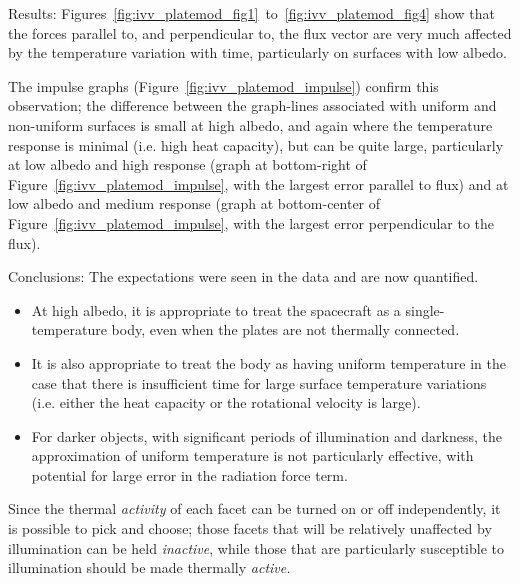 \begin{description}
   \item{Results:}\newline
     Figures~\ref{fig:ivv_platemod_fig1}~to~\ref{fig:ivv_platemod_fig4}
     show that the forces parallel to, and perpendicular
     to, the flux vector are very much affected by the temperature variation
     with time, particularly on surfaces with low albedo.

     The impulse graphs (Figure~\ref{fig:ivv_platemod_impulse}) confirm
     this observation; the
     difference between the graph-lines associated with uniform and non-uniform surfaces is small at high albedo, and again where the
     temperature response is minimal (i.e. high heat capacity), but can be quite large, particularly at
     low albedo and high response (graph at bottom-right of Figure~\ref{fig:ivv_platemod_impulse}, with the largest error parallel to flux) and at low
     albedo and medium response (graph at bottom-center of Figure~\ref{fig:ivv_platemod_impulse}, with the largest error perpendicular to the flux).

  \item{Conclusions:}\newline
     The expectations were seen in the data and are now quantified.
     \begin{itemize}
       \item {\mdseries
         At high albedo, it is appropriate to treat the spacecraft as a
         single{}-temperature body, even when the plates are not thermally
         connected.}
       \item {\mdseries
         It is also appropriate to treat the body as having uniform temperature
         in the case that there is insufficient time for large surface
         temperature variations (i.e. either the heat capacity or the rotational
         velocity is large).}
       \item {\mdseries
         For darker objects, with significant periods of illumination and
         darkness, the approximation of uniform temperature is not
         particularly effective, with potential for large error in the
         radiation force term.}
     \end{itemize}
     Since the thermal \textit{activity} of each facet can be turned on or off independently, it is possible to pick and choose; those facets that will be relatively unaffected by illumination can be held \textit{inactive}, while those that are particularly susceptible to illumination should be made thermally \textit{active.}
  \end{description}

